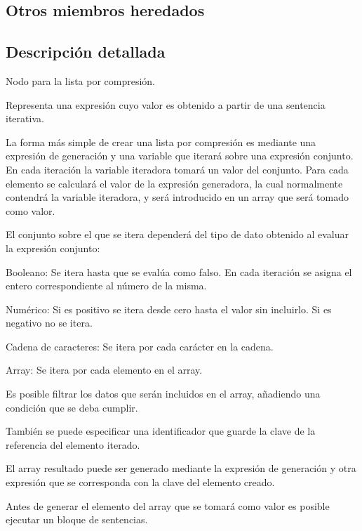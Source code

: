 \subsection*{Otros miembros heredados}


\subsection{Descripción detallada}
Nodo para la lista por compresión. 

Representa una expresión cuyo valor es obtenido a partir de una sentencia iterativa.

La forma más simple de crear una lista por compresión es mediante una expresión de generación y una variable que iterará sobre una expresión conjunto. En cada iteración la variable iteradora tomará un valor del conjunto. Para cada elemento se calculará el valor de la expresión generadora, la cual normalmente contendrá la variable iteradora, y será introducido en un array que será tomado como valor.

El conjunto sobre el que se itera dependerá del tipo de dato obtenido al evaluar la expresión conjunto\-:
\begin{DoxyItemize}
\item Booleano\-: Se itera hasta que se evalúa como falso. En cada iteración se asigna el entero correspondiente al número de la misma.
\item Numérico\-: Si es positivo se itera desde cero hasta el valor sin incluirlo. Si es negativo no se itera.
\item Cadena de caracteres\-: Se itera por cada carácter en la cadena.
\item Array\-: Se itera por cada elemento en el array.
\end{DoxyItemize}

Es posible filtrar los datos que serán incluidos en el array, añadiendo una condición que se deba cumplir.

También se puede especificar una identificador que guarde la clave de la referencia del elemento iterado.

El array resultado puede ser generado mediante la expresión de generación y otra expresión que se corresponda con la clave del elemento creado.

Antes de generar el elemento del array que se tomará como valor es posible ejecutar un bloque de sentencias. 

